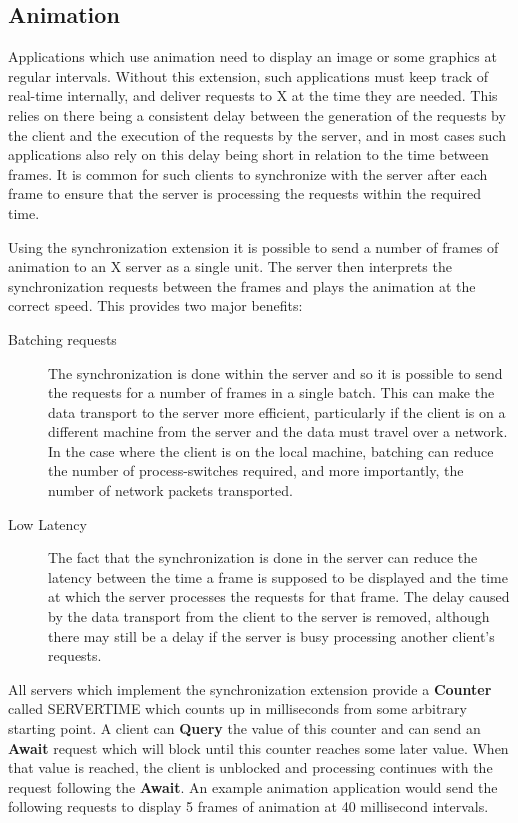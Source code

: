 \subsection*{Animation}

Applications which use animation need to display an image or some graphics at
regular intervals. Without this extension, such applications must keep track
of real-time internally, and deliver requests to X at the time they are
needed. This relies on there being a consistent delay between the generation
of the requests by the client and the execution of the requests by the server,
and in most cases such applications also rely on this delay being short in
relation to the time between frames. It is common for such clients to
synchronize with the server after each frame to ensure that the server is
processing the requests within the required time.

Using the synchronization extension it is possible to send a number of frames
of animation to an X server as a single unit. The server then interprets the
synchronization requests between the frames and plays the animation at the
correct speed. This provides two major benefits:

\begin{description}

\item[Batching requests]

The synchronization is done within the server and so it is possible to send
the requests for a number of frames in a single batch.  This can make the data
transport to the server more efficient, particularly if the client is on a
different machine from the server and the data must travel over a network.  In
the case where the client is on the local machine, batching can reduce the
number of process-switches required, and more importantly, the number
of network packets transported.

\item[Low Latency]

The fact that the synchronization is done in the server can reduce the latency
between the time a frame is supposed to be displayed and the time at which the
server processes the requests for that frame. The delay caused by the data
transport from the client to the server is removed, although there may still
be a delay if the server is busy processing another client's requests.

\end{description}

All servers which implement the synchronization extension provide a {\bf
Counter} called SERVERTIME which counts up in milliseconds from some arbitrary
starting point. A client can {\bf Query} the value of this counter and can
send an {\bf Await} request which will block until this counter reaches some
later value. When that value is reached, the client is unblocked and
processing continues with the request following the {\bf Await}. An example
animation application would send the following requests to display 5 frames of
animation at 40 millisecond intervals.

